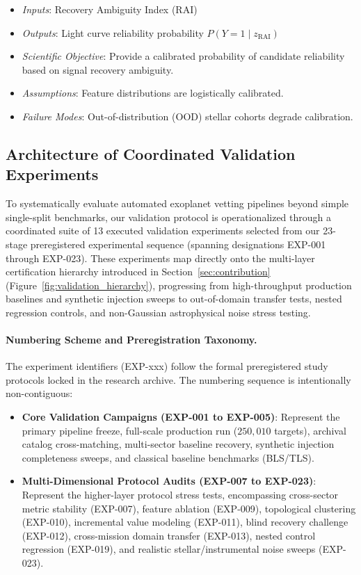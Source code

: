 \begin{itemize}
    \begin{itemize}
    \item \textit{Inputs}: Recovery Ambiguity Index (RAI)
    \item \textit{Outputs}: Light curve reliability probability $P(Y=1 \mid z_{\text{RAI}})$
    \item \textit{Scientific Objective}: Provide a calibrated probability of candidate reliability based on signal recovery ambiguity.
    \item \textit{Assumptions}: Feature distributions are logistically calibrated.
    \item \textit{Failure Modes}: Out-of-distribution (OOD) stellar cohorts degrade calibration.
    \end{itemize}
\end{itemize}

\subsection{Architecture of Coordinated Validation Experiments} \label{sec:method_experiment_matrix}

To systematically evaluate automated exoplanet vetting pipelines beyond simple single-split benchmarks, our validation protocol is operationalized through a coordinated suite of 13 executed validation experiments selected from our 23-stage preregistered experimental sequence (spanning designations EXP-001 through EXP-023). These experiments map directly onto the multi-layer certification hierarchy introduced in Section~\ref{sec:contribution} (Figure~\ref{fig:validation_hierarchy}), progressing from high-throughput production baselines and synthetic injection sweeps to out-of-domain transfer tests, nested regression controls, and non-Gaussian astrophysical noise stress testing.

\paragraph{Numbering Scheme and Preregistration Taxonomy.}
The experiment identifiers (EXP-xxx) follow the formal preregistered study protocols locked in the research archive. The numbering sequence is intentionally non-contiguous:
\begin{itemize}
    \item \textbf{Core Validation Campaigns (EXP-001 to EXP-005)}: Represent the primary pipeline freeze, full-scale production run ($250{,}010$ targets), archival catalog cross-matching, multi-sector baseline recovery, synthetic injection completeness sweeps, and classical baseline benchmarks (BLS/TLS).
    \item \textbf{Multi-Dimensional Protocol Audits (EXP-007 to EXP-023)}: Represent the higher-layer protocol stress tests, encompassing cross-sector metric stability (EXP-007), feature ablation (EXP-009), topological clustering (EXP-010), incremental value modeling (EXP-011), blind recovery challenge (EXP-012), cross-mission domain transfer (EXP-013), nested control regression (EXP-019), and realistic stellar/instrumental noise sweeps (EXP-023).
\end{itemize}

